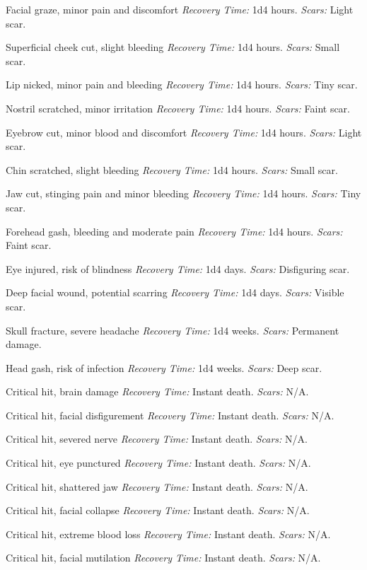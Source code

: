 \begin{description}[labelwidth=1.5em, leftmargin=*, itemsep=0.4em]
    \item[1 -] Facial graze, minor pain and discomfort \textit{Recovery Time:} 1d4 hours. \textit{Scars:} Light scar.
    \item[2 -] Superficial cheek cut, slight bleeding \textit{Recovery Time:} 1d4 hours. \textit{Scars:} Small scar.
    \item[3 -] Lip nicked, minor pain and bleeding \textit{Recovery Time:} 1d4 hours. \textit{Scars:} Tiny scar.
    \item[4 -] Nostril scratched, minor irritation \textit{Recovery Time:} 1d4 hours. \textit{Scars:} Faint scar.
    \item[5 -] Eyebrow cut, minor blood and discomfort \textit{Recovery Time:} 1d4 hours. \textit{Scars:} Light scar.
    \item[6 -] Chin scratched, slight bleeding \textit{Recovery Time:} 1d4 hours. \textit{Scars:} Small scar.
    \item[7 -] Jaw cut, stinging pain and minor bleeding \textit{Recovery Time:} 1d4 hours. \textit{Scars:} Tiny scar.
    \item[8 -] Forehead gash, bleeding and moderate pain \textit{Recovery Time:} 1d4 hours. \textit{Scars:} Faint scar.
    \item[9 -] Eye injured, risk of blindness \textit{Recovery Time:} 1d4 days. \textit{Scars:} Disfiguring scar.
    \item[10 -] Deep facial wound, potential scarring \textit{Recovery Time:} 1d4 days. \textit{Scars:} Visible scar.
    \item[11 -] Skull fracture, severe headache \textit{Recovery Time:} 1d4 weeks. \textit{Scars:} Permanent damage.
    \item[12 -] Head gash, risk of infection \textit{Recovery Time:} 1d4 weeks. \textit{Scars:} Deep scar.
    \item[13 -] Critical hit, brain damage \textit{Recovery Time:} Instant death. \textit{Scars:} N/A.
    \item[14 -] Critical hit, facial disfigurement \textit{Recovery Time:} Instant death. \textit{Scars:} N/A.
    \item[15 -] Critical hit, severed nerve \textit{Recovery Time:} Instant death. \textit{Scars:} N/A.
    \item[16 -] Critical hit, eye punctured \textit{Recovery Time:} Instant death. \textit{Scars:} N/A.
    \item[17 -] Critical hit, shattered jaw \textit{Recovery Time:} Instant death. \textit{Scars:} N/A.
    \item[18 -] Critical hit, facial collapse \textit{Recovery Time:} Instant death. \textit{Scars:} N/A.
    \item[19 -] Critical hit, extreme blood loss \textit{Recovery Time:} Instant death. \textit{Scars:} N/A.
    \item[20 -] Critical hit, facial mutilation \textit{Recovery Time:} Instant death. \textit{Scars:} N/A.
\end{description}

